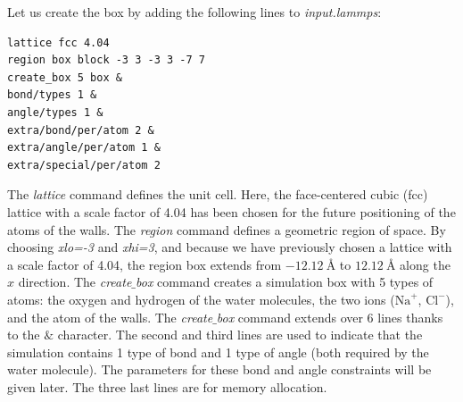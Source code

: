 \documentclass[9pt,tutorial]{livecoms}
\begin{document}
Let us create the box by adding the following lines to \textit{input.lammps}:
{\normalsize \begin{verbatim}
lattice fcc 4.04
region box block -3 3 -3 3 -7 7
create_box 5 box &
bond/types 1 &
angle/types 1 &
extra/bond/per/atom 2 &
extra/angle/per/atom 1 &
extra/special/per/atom 2
\end{verbatim}}
The \textit{lattice} command defines the unit cell. Here, the face-centered cubic (fcc) lattice with a scale factor of
4.04 has been chosen for the future positioning of the atoms of the walls. The \textit{region} command defines a geometric
region of space. By choosing \textit{xlo=-3} and \textit{xhi=3}, and because we have previously chosen a lattice with a scale
factor of 4.04, the region box extends from $-12.12~\text{\AA{}}$ to $12.12~\text{\AA{}}$ along the $x$ direction. The \textit{create$\_$box} command creates a simulation box with 5 types of atoms: the oxygen and hydrogen of the water molecules, the two ions ($\text{Na}^+$,
$\text{Cl}^-$), and the atom of the walls. The \textit{create$\_$box} command extends over 6 lines thanks to the $\&$ character. The second and third lines are used to indicate that the simulation contains 1 type of bond and 1 type of angle (both required by the water molecule). The parameters for these bond and angle constraints will be given later. The three last lines are for memory allocation.
\end{document}

